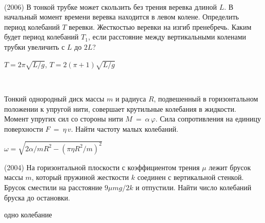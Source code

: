 \begin{ex}
\hspace{0pt} \\
\begin{minipage}{.65\textwidth} 
(2006) В тонкой трубке может скользить без трения веревка длиной $L$. В начальный момент времени веревка находится в левом колене. 
Определить период колебаний $T$ веревки. Жесткостью веревки на изгиб пренебречь. 
Каким будет период колебаний $T_1$, если расстояние между вертикальными коленами трубки увеличить с $L$ до $2L$?
\end{minipage}
\begin{minipage}{.35\textwidth}
\centering

\end{minipage}
\begin{ans}
$T=2\pi\sqrt{L/g}$, $T=2(\pi+1)\sqrt{L/g}$
\end{ans}
\end{ex}


\begin{ex}
\hspace{0pt} \\
\begin{minipage}{.65\textwidth} 
Тонкий однородный диск массы $m$ и радиуса $R$, подвешенный в горизонтальном положении к упругой нити, совершает крутильные колебания в жидкости. 
Момент упругих сил со стороны нити $M~=~\alpha\,\varphi$.  Сила сопротивления на единицу поверхности $F~=~\eta\,v$. Найти частоту малых колебаний.
\end{minipage}
\begin{minipage}{.35\textwidth}
\centering

\end{minipage}
\begin{ans}
$\omega = \sqrt{2\alpha/mR^2-(\pi \eta R^2/m)^2}$
\end{ans}
\end{ex}

\begin{ex}
(2004) На горизонтальной плоскости с коэффициентом трения $\mu$ лежит брусок массы $m$, который пружиной жесткости $k$ соединен с вертикальной стенкой. Брусок сместили на расстояние $9\mu mg /2k$ и отпустили. Найти число колебаний бруска до остановки.
\begin{ans}
одно колебание
\end{ans}
\end{ex}

